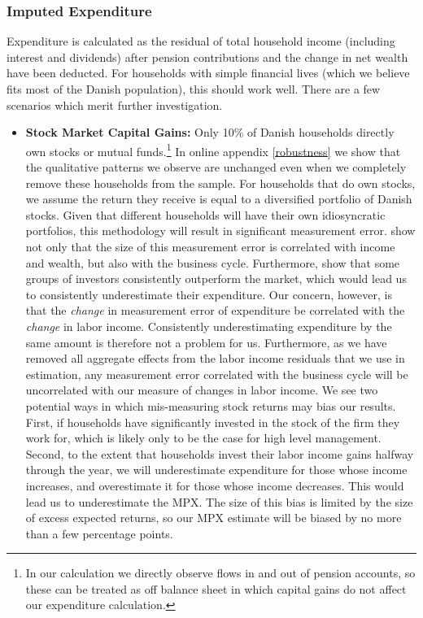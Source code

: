 \documentclass[titlepage]{\econtex}\newcommand{\texname}{ConsumptionHeterogeneity}
\begin{document}
\subsubsection{Imputed Expenditure}
Expenditure is calculated as the residual of total household income (including interest and dividends) after pension contributions and the change in net wealth have been deducted. For households with simple financial lives (which we believe fits most of the Danish population), this should work well. There are a few scenarios which merit further investigation.
\begin{itemize}
	\item \textbf{Stock Market Capital Gains:} Only 10\% of Danish households directly own stocks or mutual funds.\footnote{In our calculation we directly observe flows in and out of pension accounts, so these can be treated as off balance sheet in which capital gains do not affect our expenditure calculation.} In online appendix \ref{robustness} we show that the qualitative patterns we observe are unchanged even when we completely remove these households from the sample. For households that do own stocks, we assume the return they receive is equal to a diversified portfolio of Danish stocks. Given that different households will have their own idiosyncratic portfolios, this methodology will result in significant measurement error. \cite{baker_measurement_2018} show not only that the size of this measurement error is correlated with income and wealth, but also with the business cycle. Furthermore, \cite{fagereng_persistence_2016} show that some groups of investors consistently outperform the market, which would lead us to consistently underestimate their expenditure. Our concern, however, is that the \textit{change} in measurement error of expenditure be correlated with the \textit{change} in labor income. Consistently underestimating expenditure by the same amount is therefore not a problem for us. Furthermore, as we have removed all aggregate effects from the labor income residuals that we use in estimation, any measurement error correlated with the business cycle will be uncorrelated with our measure of changes in labor income. We see two potential ways in which mis-measuring stock returns may bias our results. First, if households have significantly invested in the stock of the firm they work for, which is likely only to be the case for high level management. Second, to the extent that households invest their labor income gains halfway through the year, we will underestimate expenditure for those whose income increases, and overestimate it for those whose income decreases. This would lead us to underestimate the MPX. The size of this bias is limited by the size of excess expected returns, so our MPX estimate will be biased by no more than a few percentage points.

\end{itemize}
\end{document}
